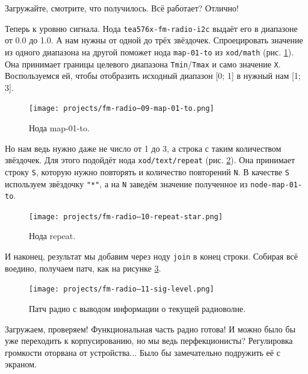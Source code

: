 Загружайте, смотрите, что получилось. Всё работает? Отлично!

Теперь к уровню сигнала. Нода \texttt{tea576x-fm-radio-i2c} выдаёт его в диапазоне от 0.0 до 1.0. А нам нужны от одной до трёх звёздочек. Спроецировать значение из одного диапазона на другой поможет нода \texttt{map-01-to} из \texttt{xod/math} (рис. \ref{patch:node-map-01-to}). Она принимает границы целевого диапазона \texttt{Tmin}/\texttt{Tmax} и само значение \texttt{X}. Воспользуемся ей, чтобы отобразить исходный диапазон [0; 1] в нужный нам [1; 3].

\begin{figure}
  \centering
  \texttt{[image: projects/fm-radio--09-map-01-to.png]}
  \caption{Нода map-01-to.}
  \label{patch:node-map-01-to}
\end{figure}

Но нам ведь нужно даже не число от 1 до 3, а строка с таким количеством звёздочек. Для этого подойдёт нода \texttt{xod/text/repeat} (рис. \ref{patch:node-repeat}). Она принимает строку \texttt{S}, которую нужно повторять и количество повторений \texttt{N}. В качестве \texttt{S} используем звёздочку \texttt{"*"}, а на \texttt{N} заведём значение полученное из \texttt{node-map-01-to}.

\begin{figure}
  \centering
  \texttt{[image: projects/fm-radio--10-repeat-star.png]}
  \caption{Нода repeat.}
  \label{patch:node-repeat}
\end{figure}

И наконец, результат мы добавим через ноду \texttt{join} в конец строки. Собирая всё воедино, получаем патч, как на рисунке \ref{patch:fm-lcd-line-1}.

\begin{figure}
  \centering
  \texttt{[image: projects/fm-radio--11-sig-level.png]}
  \caption{Патч радио с выводом информации о текущей радиоволне.}
  \label{patch:fm-lcd-line-1}
\end{figure}

Загружаем, проверяем! Функциональная часть радио готова! И можно было бы уже переходить к корпусированию, но мы ведь перфекционисты? Регулировка громкости оторвана от устройства... Было бы замечательно подружить её с экраном.

